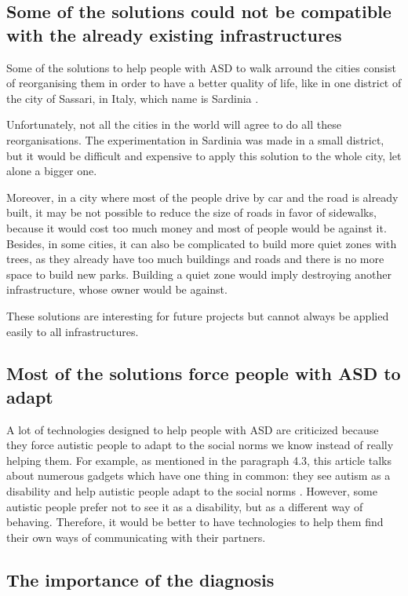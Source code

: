 \subsection{Some of the solutions could not be compatible with the already existing infrastructures}

Some of the solutions to help people with ASD to walk arround the cities consist of reorganising them in order to have a better quality of life, like in one district of the city of Sassari, in Italy, which name is Sardinia \cite{2018MobilityPoliciesExtraSmall}.

Unfortunately, not all the cities in the world will agree to do all these reorganisations. The experimentation in Sardinia was made in a small district, but it would be difficult and expensive to apply this solution to the whole city, let alone a bigger one.

Moreover, in a city where most of the people drive by car and the road is already built, it may be not possible to reduce the size of roads in favor of sidewalks, because it would cost too much money and most of people would be against it. Besides, in some cities, it can also be complicated to build more quiet zones with trees, as they already have too much buildings and roads and there is no more space to build new parks. Building a quiet zone would imply destroying another infrastructure, whose owner would be against. 

These solutions are interesting for future projects but cannot always be applied easily to all infrastructures.

\subsection{Most of the solutions force people with ASD to adapt}

A lot of technologies designed to help people with ASD are criticized because they force autistic people to adapt to the social norms we know instead of really helping them. For example, as mentioned in the paragraph 4.3, this article talks about numerous gadgets which have one thing in common: they see autism as a disability and help autistic people adapt to the social norms \cite{2017UTravelSmartMobility}. However, some autistic people prefer not to see it as a disability, but as a different way of behaving. Therefore, it would be better to have technologies to help them find their own ways of communicating with their partners. 

\subsection{The importance of the diagnosis}

